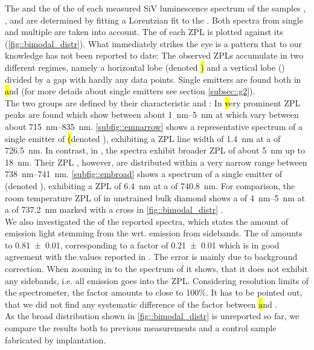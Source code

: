 	The \cwl and the \lw of the \zpl of each measured SiV luminescence spectrum of the samples \insituF, \insituS, and \insituH are determined by fitting a Lorentzian fit to the \ZPL.
	Both spectra from single and multiple \sivs are taken into account.
	The \lw of each ZPL is plotted against its \cwl (\autoref{fig::bimodal_distr}).
	What immediately strikes the eye is a pattern that to our knowledge has not been reported to date: 
	The observed ZPLs accumulate in two different regimes, namely a horizontal lobe (denoted \hl) and a vertical lobe (\vl) divided by a gap with hardly any data points. 
	Single emitters are found both in \hl and \vl (for more details about single emitters see section \ref{subsec::g2}).
	\\
	The two groups are defined by their characteristic \cwls and \lws: 
	In \hl very prominent ZPL peaks are found which show \lws between about \SIrange{1}{5}{nm} at \cwls which vary between about \SIrange{715}{835}{nm}.
	\autoref{subfig::emnarrow} shows a representative spectrum of a single emitter of \hl (denoted \emnarrow), exhibiting a ZPL line width of \SI{1.4}{nm} at a \cwl of \SI{726.5}{nm}.
	In contrast, in \vl, the spectra exhibit broader ZPL \lws of about \SI{5}{nm} up to \SI{18}{nm}.
	Their ZPL \cwls, however, are distributed within a very narrow range between \SIrange{738}{741}{nm}.
	\autoref{subfig::embroad} shows a spectrum of a single emitter of \vl (denoted \embroad), exhibiting a ZPL \lw of \SI{6.4}{nm} at a \cwl of \SI{740.8}{nm}.
	For comparison, the room temperature ZPL of \sivs in unstrained bulk diamond shows a \lw of \SIrange{4}{5}{nm} at a \cwl of \SI{737.2}{nm} marked with a cross in \autoref{fig::bimodal_distr} \cite{Arend2016a,Dietrich2014}. 
	\\
	We also investigated the \db of the reported spectra, which states the amount of emission light stemming from the \ZPL wrt. emission from sidebands.
	The \db of \emnarrow  amounts to \num[separate-uncertainty]{0.81(1)}, corresponding to a \hr factor of \num[separate-uncertainty]{0.21(1)} which is in good agreement with the values reported in \cite{Neu2011b}.
	The error is mainly due to background correction. 
	When zooming in to the spectrum of \embroad it shows, that it does not exhibit any sidebands, i.e. all emission goes into the ZPL. 
	Considering resolution limits of the spectrometer, the \db factor amounts to close to 100\%.
	It has to be pointed out, that we did not find any systematic difference of the \db factor between \hl and \vl.
	\\
	As the broad \ZPL distribution shown in \autoref{fig::bimodal_distr} is unreported so far, we compare the results both to previous measurements and a control sample fabricated by \si implantation.
